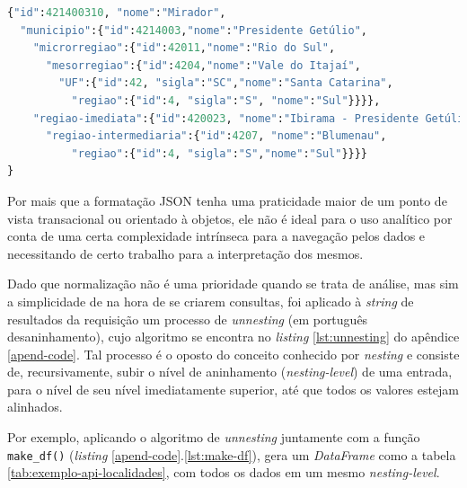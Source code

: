 \begin{lstlisting}[float = h, label={lst:exemplo-api-localidades},language=Python, caption=Exemplo de resultado de uma requisição da API de localidades.]
{"id":421400310, "nome":"Mirador",
  "municipio":{"id":4214003,"nome":"Presidente Getúlio",
    "microrregiao":{"id":42011,"nome":"Rio do Sul",
      "mesorregiao":{"id":4204,"nome":"Vale do Itajaí",
        "UF":{"id":42, "sigla":"SC","nome":"Santa Catarina",
          "regiao":{"id":4, "sigla":"S", "nome":"Sul"}}}},
    "regiao-imediata":{"id":420023, "nome":"Ibirama - Presidente Getúlio",
      "regiao-intermediaria":{"id":4207, "nome":"Blumenau",
          "regiao":{"id":4, "sigla":"S","nome":"Sul"}}}}
}
\end{lstlisting}

    
    Por mais que a formatação JSON tenha uma praticidade maior de um ponto de vista transacional ou orientado à objetos, ele não é ideal para o uso analítico por conta de uma certa complexidade intrínseca para a navegação pelos dados e necessitando de certo trabalho para a interpretação dos mesmos. 
    
    Dado que normalização não é uma prioridade quando se trata de análise, mas sim a simplicidade de na hora de se criarem consultas, foi aplicado à \textit{string} de resultados da requisição um processo de \textit{unnesting} (em português desaninhamento), cujo algoritmo se encontra no \textit{listing} \ref{lst:unnesting} do apêndice \ref{apend-code}. Tal processo é o oposto do conceito conhecido por \textit{nesting} e consiste de, recursivamente, subir o nível de aninhamento (\textit{nesting-level}) de uma entrada, para o nível de seu nível imediatamente superior, até que todos os valores estejam alinhados.

    Por exemplo, aplicando o algoritmo de \textit{unnesting} juntamente com a função \verb|make_df()| (\textit{listing} \ref{apend-code}.\ref{lst:make-df}), gera um \textit{DataFrame} como a tabela \ref{tab:exemplo-api-localidades}, com todos os dados em um mesmo \textit{nesting-level}.

